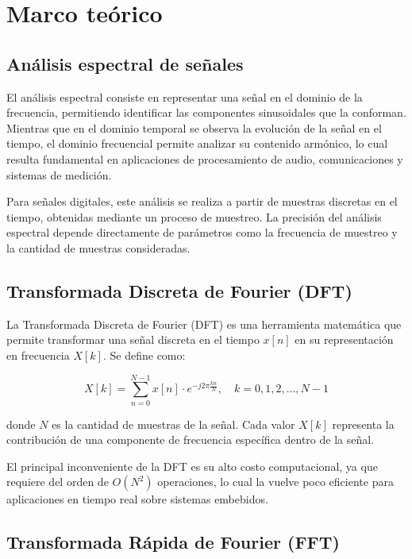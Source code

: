 \documentclass[12pt]{article}
\begin{document}
	\section{Marco teórico}

    \subsection{Análisis espectral de señales}

    El análisis espectral consiste en representar una señal en el dominio de la frecuencia, permitiendo identificar las componentes sinusoidales que la conforman. Mientras que en el dominio temporal se observa la evolución de la señal en el tiempo, el dominio frecuencial permite analizar su contenido armónico, lo cual resulta fundamental en aplicaciones de procesamiento de audio, comunicaciones y sistemas de medición.

    Para señales digitales, este análisis se realiza a partir de muestras discretas en el tiempo, obtenidas mediante un proceso de muestreo. La precisión del análisis espectral depende directamente de parámetros como la frecuencia de muestreo y la cantidad de muestras consideradas.

    \subsection{Transformada Discreta de Fourier (DFT)} 

    La Transformada Discreta de Fourier (DFT) es una herramienta matemática que permite transformar una señal discreta en el tiempo $x[n]$ en su representación en frecuencia $X[k]$. Se define como:

    \[
    X[k] = \sum_{n=0}^{N-1} x[n] \cdot e^{-j 2\pi \frac{k n}{N}}, \quad k = 0,1,2,\dots,N-1
    \]

    donde $N$ es la cantidad de muestras de la señal. Cada valor $X[k]$ representa la contribución de una componente de frecuencia específica dentro de la señal.

    El principal inconveniente de la DFT es su alto costo computacional, ya que requiere del orden de $O(N^2)$ operaciones, lo cual la vuelve poco eficiente para aplicaciones en tiempo real sobre sistemas embebidos.

    \subsection{Transformada Rápida de Fourier (FFT)}
\end{document}

